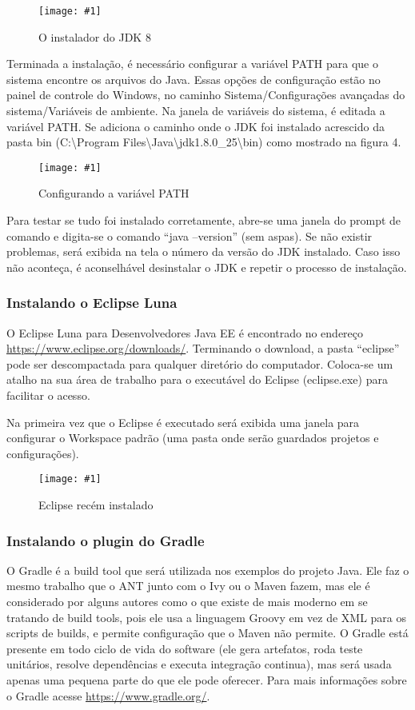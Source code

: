 \documentclass[a4paper,12pt]{article}
\newcommand{\figura}[2] {
	\begin{figure}[ht]
		\centering
		\texttt{[image: \#1]}
		\caption{#2}
	\end{figure}
	\FloatBarrier
}
\begin{document}
\figura{jdk81.jpg}{O instalador do JDK 8}

Terminada a instalação, é necessário configurar a variável PATH para que o sistema encontre os arquivos do Java. Essas opções de configuração estão no painel de controle do Windows, no caminho Sistema/Configurações avançadas do sistema/Variáveis de ambiente. Na janela de variáveis do sistema, é editada a variável PATH. Se adiciona o caminho onde o JDK foi instalado acrescido da pasta bin (C:\textbackslash Program Files\textbackslash Java\textbackslash jdk\textmd{1.8.0\_25}\textbackslash bin) como mostrado na figura 4.

\figura{path1.png}{Configurando a variável PATH}

Para testar se tudo foi instalado corretamente, abre-se uma janela do prompt de comando e digita-se o comando “java –version” (sem aspas). Se não existir problemas, será exibida na tela o número da versão do JDK instalado. Caso isso não aconteça, é aconselhável desinstalar o JDK e repetir o processo de instalação. 

\subsubsection{Instalando o Eclipse Luna} 

O Eclipse Luna para Desenvolvedores Java EE é encontrado no endereço \url{https://www.eclipse.org/downloads/}. Terminando o download, a pasta “eclipse” pode ser descompactada para qualquer diretório do computador. Coloca-se um atalho na sua área de trabalho para o executável do Eclipse (eclipse.exe) para facilitar o acesso.

Na primeira vez que o Eclipse é executado será exibida uma janela para configurar o Workspace padrão (uma pasta onde serão guardados projetos e configurações).

\figura{eclipse1.png}{Eclipse recém instalado}

\subsubsection{Instalando o plugin do Gradle} 

O Gradle é a build tool que será utilizada nos exemplos do projeto Java. Ele faz o mesmo trabalho que o ANT junto com o Ivy ou o Maven fazem, mas ele é considerado por alguns autores como o que existe de mais moderno em se tratando de build tools, pois ele usa a linguagem Groovy em vez de XML para os scripts de builds, e permite configuração que o Maven não permite. O Gradle está presente em todo ciclo de vida do software (ele gera artefatos, roda teste unitários, resolve dependências e executa integração continua), mas será usada apenas uma pequena parte do que ele pode oferecer. Para mais informações sobre o Gradle acesse \url{https://www.gradle.org/}.
\end{document}
